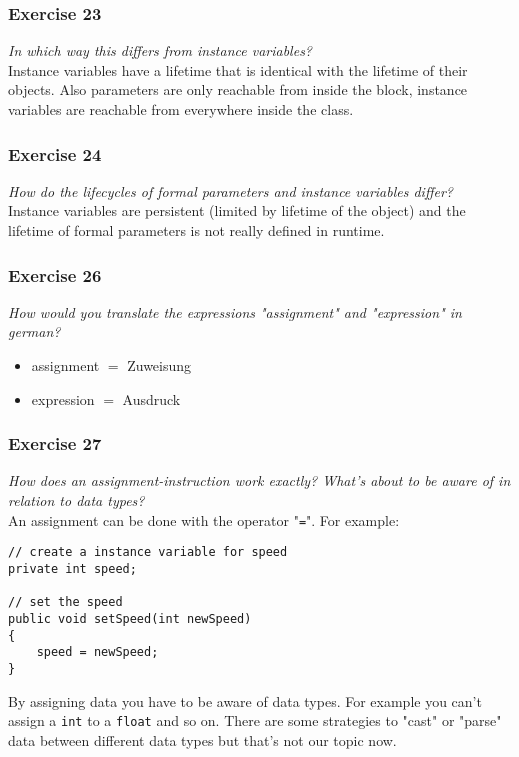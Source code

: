 \subsubsection*{Exercise 23}
\textit{In which way this differs from instance variables?}\\

Instance variables have a lifetime that is identical with the lifetime of
their objects. Also parameters are only reachable from inside the block,
instance variables are reachable from everywhere inside the class.

\subsubsection*{Exercise 24}
\textit{How do the lifecycles of formal parameters and instance variables 
	differ?}\\

Instance variables are persistent (limited by lifetime of the object) and
the lifetime of formal parameters is not really defined in runtime.

\subsubsection*{Exercise 26}
\textit{How would you translate the expressions "assignment" and 
	"expression" in german?}\\

\begin{itemize}
	\item assignment $=$ Zuweisung
	\item expression $=$ Ausdruck
\end{itemize}

\subsubsection*{Exercise 27}
\textit{How does an assignment-instruction work exactly? What's about to 
	be aware of in relation to data types?}\\

An assignment can be done with the operator "\lstinline{=}". For example:
\begin{lstlisting}
// create a instance variable for speed
private int speed;

// set the speed
public void setSpeed(int newSpeed)
{
	speed = newSpeed;
}
\end{lstlisting}
By assigning data
you have to be aware of data types. For example you can't assign a 
\lstinline{int} to a \lstinline{float} and so on. There are some strategies
to "cast" or "parse" data between different data types but that's not our 
topic now.

